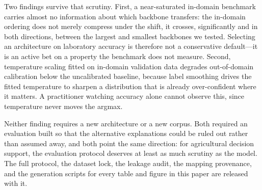 \documentclass[runningheads]{llncs}
\begin{document}
Two findings survive that scrutiny. First, a near-saturated in-domain benchmark
carries almost no information about which backbone transfers: the in-domain
ordering does not merely compress under the shift, it crosses, significantly and
in both directions, between the largest and smallest backbones we tested.
Selecting an architecture on laboratory accuracy is therefore not a conservative
default---it is an active bet on a property the benchmark does not measure.
Second, temperature scaling fitted on in-domain validation data degrades
out-of-domain calibration below the uncalibrated baseline, because label
smoothing drives the fitted temperature to sharpen a distribution that is
already over-confident where it matters. A practitioner watching accuracy alone
cannot observe this, since temperature never moves the argmax.

Neither finding requires a new architecture or a new corpus. Both required an
evaluation built so that the alternative explanations could be ruled out rather
than assumed away, and both point the same direction: for agricultural decision
support, the evaluation protocol deserves at least as much scrutiny as the
model. The full protocol, the dataset lock, the leakage audit, the mapping
provenance, and the generation scripts for every table and figure in this paper
are released with it.



\end{document}
